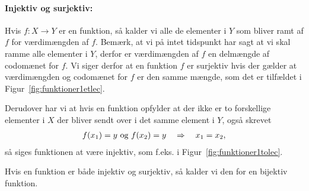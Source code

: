 \paragraph*{Injektiv og surjektiv:}
Hvis $f \colon X \to Y$ er en funktion, så kalder vi alle de elementer i $Y$ som bliver ramt af $f$ for værdimængden af $f$. Bemærk, at vi på intet tidspunkt har sagt at vi skal ramme alle elementer i $Y$, derfor er værdimængden af $f$ en delmængde af codomænet for $f$. Vi siger derfor at en funktion $f$ er surjektiv hvis der gælder at værdimængden og codomænet for $f$ er den samme mængde, som det er tilfældet i Figur~\ref{fig:funktioner1etlec}.

Derudover har vi at hvis en funktion opfylder at der ikke er to forskellige elementer i $X$ der bliver sendt over i det samme element i $Y$, også skrevet
\begin{align*}
f(x_1) = y \textup{ og } f(x_2) =y \quad  \Rightarrow \quad x_1=x_2, 
\end{align*}
så siges funktionen at være injektiv, som f.eks. i Figur~\ref{fig:funktioner1tolec}. 

Hvis en funktion er både injektiv og surjektiv, så kalder vi den for en bijektiv funktion.

